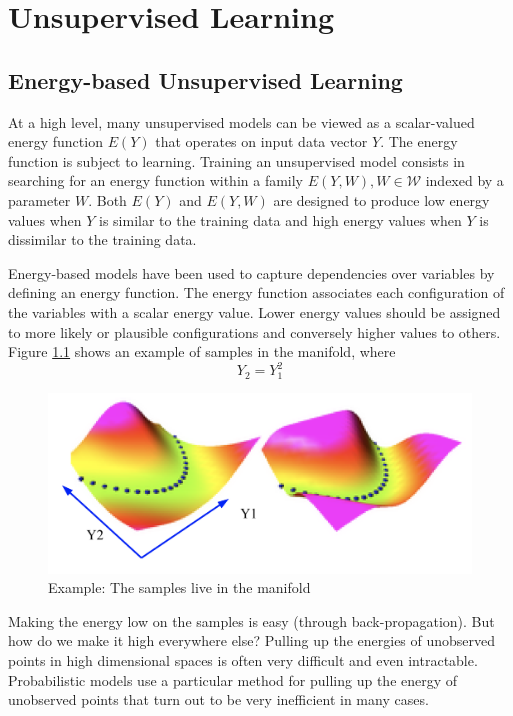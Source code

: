 \chapter{Unsupervised Learning}

\section{Energy-based Unsupervised Learning}

At a high level, many unsupervised models can be viewed as a scalar-valued energy function $E(Y)$ that operates on input data vector $Y$.
The energy function is subject to learning.
Training an unsupervised model consists in searching for an energy function within a family ${E(Y, W), W \in \mathcal{W}}$ indexed by a parameter $W$.
Both $E(Y)$ and $E(Y, W)$  are designed to produce low energy values when $Y$ is similar to the training data and high energy values when $Y$ is dissimilar to the training data.

Energy-based models have been used to capture dependencies over variables by defining an energy function.
The energy function associates each configuration of the variables with a scalar energy value. 
Lower energy values should be assigned to more likely or plausible configurations and conversely higher values to others. Figure \ref{figure1} shows an example of samples in the manifold, where 
\begin{equation}
    Y_2 = Y_1^2
\end{equation}
\begin{figure}[H]
        \centering
        \includegraphics[width=\textwidth]{lectures/10-b/image/pic2.png}
        \caption{Example: The samples live in the manifold}
        \label{figure1}
    \end{figure}
Making the energy low on the samples is easy (through back-propagation). But how do we make it high everywhere else? Pulling up the energies of unobserved points in high dimensional spaces is often very difficult and even intractable. 
Probabilistic models use a particular method for pulling up the energy of unobserved points that turn out to be very inefficient in many cases.

